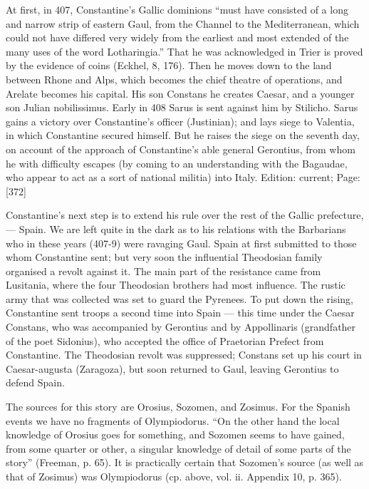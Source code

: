 At first, in 407, Constantine\texthebrew{}’s Gallic dominions \texthebrew{“}must have consisted of a long and narrow strip of eastern Gaul, from the Channel to the Mediterranean, which could not have differed very widely from the earliest and most extended of the many uses of the word Lotharingia.\texthebrew{}” That he was acknowledged in Trier is proved by the evidence of coins (Eckhel, 8, 176). Then he moves down to the land between Rhone and Alps, which becomes the chief theatre of operations, and Arelate becomes his capital. His son Constans he creates Caesar, and a younger son Julian nobilissimus. Early in 408 Sarus is sent against him by Stilicho. Sarus gains a victory over Constantine\texthebrew{}’s officer (Justinian); and lays siege to Valentia, in which Constantine secured himself. But he raises the siege on the seventh day, on account of the approach of Constantine\texthebrew{}’s able general Gerontius, from whom he with difficulty escapes (by coming to an understanding with the Bagaudae, who appear to act as a sort of national militia) into Italy.
Edition: current; Page: [372]

Constantine\texthebrew{}’s next step is to extend his rule over the rest of the Gallic prefecture, \texthebrew{—} Spain. We are left quite in the dark as to his relations with the Barbarians who in these years (407-9) were ravaging Gaul. Spain at first submitted to those whom Constantine sent; but very soon the influential Theodosian family organised a revolt against it. The main part of the resistance came from Lusitania, where the four Theodosian brothers had most influence. The rustic army that was collected was set to guard the Pyrenees. To put down the rising, Constantine sent troops a second time into Spain \texthebrew{—} this time under the Caesar Constans, who was accompanied by Gerontius and by Appollinaris (grandfather of the poet Sidonius), who accepted the office of Praetorian Prefect from Constantine. The Theodosian revolt was suppressed; Constans set up his court in Caesar-augusta (Zaragoza), but soon returned to Gaul, leaving Gerontius to defend Spain.

The sources for this story are Orosius, Sozomen, and Zosimus. For the Spanish events we have no fragments of Olympiodorus. \texthebrew{“}On the other hand the local knowledge of Orosius goes for something, and Sozomen seems to have gained, from some quarter or other, a singular knowledge of detail of some parts of the story\texthebrew{}” (Freeman, p. 65). It is practically certain that Sozomen\texthebrew{}’s source (as well as that of Zosimus) was Olympiodorus (cp. above, vol. ii. Appendix 10, p. 365).

